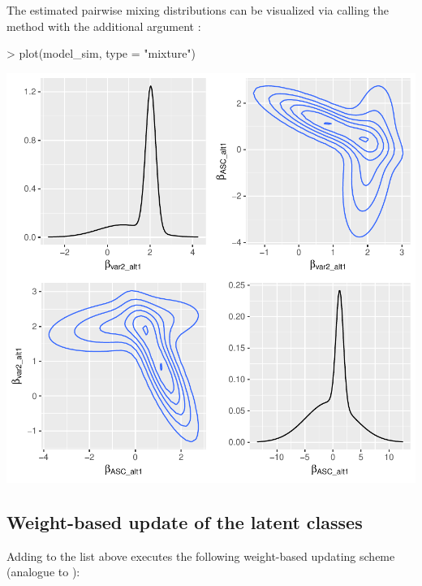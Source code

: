 \documentclass[article]{jss}
\newcommand{\fct}[1]{\code{#1()}}
\begin{document}
The estimated pairwise mixing distributions can be visualized via calling the \fct{plot} method with the additional argument :

\begin{Schunk}
\begin{Sinput}
> plot(model_sim, type = "mixture")
\end{Sinput}
\end{Schunk}
\includegraphics{rprobitb_oelschlaeger_bauer-model-sim-mixture}


\subsection{Weight-based update of the latent classes} \label{subsec:weight_update}

Adding  to the list  above executes the following weight-based updating scheme (analogue to \cite{Bauer:2019}):
\end{document}
